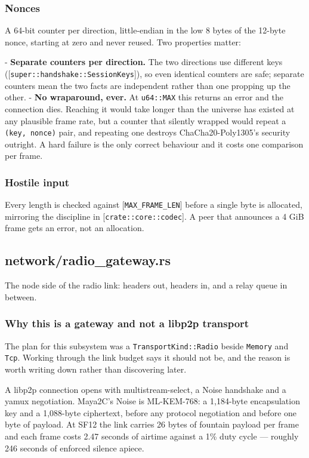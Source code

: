 \documentclass[11pt,a4paper]{article}
\begin{document}
\subsubsection{Nonces}

A 64-bit counter per direction, little-endian in the low 8 bytes of the
12-byte nonce, starting at zero and never reused. Two properties matter:

- \textbf{Separate counters per direction.} The two directions use different keys
  ([\texttt{super::handshake::SessionKeys}]), so even identical counters are safe;
  separate counters mean the two facts are independent rather than one
  propping up the other.
- \textbf{No wraparound, ever.} At \texttt{u64::MAX} this returns an error and the
  connection dies. Reaching it would take longer than the universe has
  existed at any plausible frame rate, but a counter that silently wrapped
  would repeat a \texttt{(key, nonce)} pair, and repeating one destroys
  ChaCha20-Poly1305's security outright. A hard failure is the only correct
  behaviour and it costs one comparison per frame.

\subsubsection{Hostile input}

Every length is checked against [\texttt{MAX\_FRAME\_LEN}] before a single byte is
allocated, mirroring the discipline in [\texttt{crate::core::codec}]. A peer that
announces a 4 GiB frame gets an error, not an allocation.

\subsection{network/radio\_gateway.rs}
The node side of the radio link: headers out, headers in, and a relay
queue in between.

\subsubsection{Why this is a gateway and not a libp2p transport}

The plan for this subsystem was a \texttt{TransportKind::Radio} beside \texttt{Memory} and
\texttt{Tcp}. Working through the link budget says it should not be, and the reason
is worth writing down rather than discovering later.

A libp2p connection opens with multistream-select, a Noise handshake and a
yamux negotiation. Maya2C's Noise is ML-KEM-768: a 1,184-byte encapsulation
key and a 1,088-byte ciphertext, before any protocol negotiation and before
one byte of payload. At SF12 the link carries 26 bytes of fountain payload
per frame and each frame costs 2.47 seconds of airtime against a 1\% duty
cycle — roughly 246 seconds of enforced silence apiece.
\end{document}
